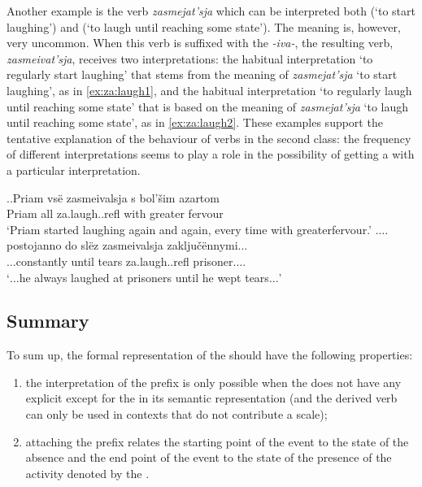 Another example is the verb \textit{zasmejat'sja} which can be interpreted both  (`to start laughing') and  (`to laugh until reaching some state'). The  meaning is, however, very uncommon. When this verb is suffixed with the  \textit{-iva-}, the resulting verb, \textit{zasmeivat'sja}, receives two interpretations: the habitual interpretation `to regularly start laughing' that stems from the  meaning of \textit{zasmejat'sja} `to start laughing', as in \ref{ex:za:laugh1}, and the habitual interpretation `to regularly laugh until reaching some state' that is based on the  meaning of \textit{zasmejat'sja} `to laugh until reaching some state', as in \ref{ex:za:laugh2}. These examples support the tentative explanation of the behaviour of verbs in the second class: the frequency of different interpretations seems to play a role in the possibility of getting a  with a particular interpretation.

\ex.\label{ex:za:laugh}\ag.\label{ex:za:laugh1}Priam vs\"{e} zasmeivalsja s bol'\v{s}im azartom\\
Priam all za.laugh..refl with greater fervour\\
\trans `Priam started laughing again and again, every time with greater\linebreak fervour.'
\bg.\label{ex:za:laugh2}$\ldots$postojanno do sl\"{e}z zasmeivalsja zaklju\v{c}\"{e}nnymi$\ldots$\\
$\ldots$constantly until tears za.laugh..refl prisoner.$\ldots$\\
\trans `$\ldots$he always laughed at prisoners until he wept tears$\ldots$'


\subsection{Summary}
To sum up, the formal representation of the   should have the following properties: 
\begin{enumerate}
\item the  interpretation of the prefix is only possible when the  does not have any explicit  except for the  in its semantic representation (and the derived verb can only be used in contexts that do not contribute a scale);
\item attaching the prefix  relates the starting point of the event to the state of the absence and the end point of the event to the state of the presence of the activity denoted by the .
\end{enumerate}

